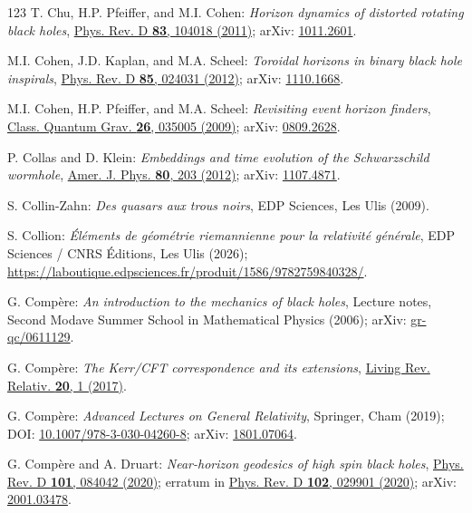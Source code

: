 \begin{thebibliography}{123}
T. Chu, H.P. Pfeiffer, and M.I. Cohen:
{\em Horizon dynamics of distorted rotating black holes},
\href{https://doi.org/10.1103/PhysRevD.83.104018}{Phys. Rev. D {\bf 83}, 104018 (2011)};
arXiv: \href{https://arxiv.org/abs/1011.2601}{1011.2601}.

M.I. Cohen, J.D. Kaplan, and M.A. Scheel:
{\em Toroidal horizons in binary black hole inspirals},
\href{https://doi.org/10.1103/PhysRevD.85.024031}{Phys. Rev. D {\bf 85}, 024031 (2012)};
arXiv: \href{https://arxiv.org/abs/1110.1668}{1110.1668}.

M.I. Cohen, H.P. Pfeiffer, and M.A. Scheel:
{\em Revisiting event horizon finders},
\href{https://doi.org/10.1088/0264-9381/26/3/035005}{Class. Quantum Grav. {\bf 26}, 035005 (2009)};
arXiv: \href{https://arxiv.org/abs/0809.2628}{0809.2628}.

P. Collas and D. Klein:
{\em Embeddings and time evolution of the Schwarzschild wormhole},
\href{https://doi.org/10.1119/1.3672848}{Amer. J. Phys. {\bf 80}, 203 (2012)};
arXiv: \href{https://arxiv.org/abs/1107.4871}{1107.4871}.

S. Collin-Zahn:
{\em Des quasars aux trous noirs},
EDP Sciences, Les Ulis (2009).

S. Collion:
{\em Éléments de géométrie riemannienne pour la relativité générale},
EDP Sciences / CNRS Éditions, Les Ulis (2026);
{\footnotesize \url{https://laboutique.edpsciences.fr/produit/1586/9782759840328/}}.

G. Compère:
{\em An introduction to the mechanics of black holes},
Lecture notes, Second Modave Summer School in Mathematical Physics (2006);
arXiv: \href{https://arxiv.org/abs/gr-qc/0611129}{gr-qc/0611129}.

G. Compère:
{\em The Kerr/CFT correspondence and its extensions},
\href{https://doi.org/10.1007/s41114-017-0003-2}{Living Rev. Relativ. {\bf 20}, 1 (2017)}.

G. Compère:
{\em Advanced Lectures on General Relativity},
Springer, Cham (2019);
DOI: \href{https://doi.org/10.1007/978-3-030-04260-8}{10.1007/978-3-030-04260-8};
arXiv: \href{https://arxiv.org/abs/1801.07064}{1801.07064}.

G. Compère and A. Druart:
{\em Near-horizon geodesics of high spin black holes},
\href{https://doi.org/10.1103/PhysRevD.101.084042}{Phys. Rev. D {\bf 101}, 084042 (2020)}; erratum in \href{https://doi.org/10.1103/PhysRevD.102.029901}{Phys. Rev. D {\bf 102}, 029901 (2020)};
arXiv: \href{https://arxiv.org/abs/2001.03478}{2001.03478}.


\end{thebibliography}
